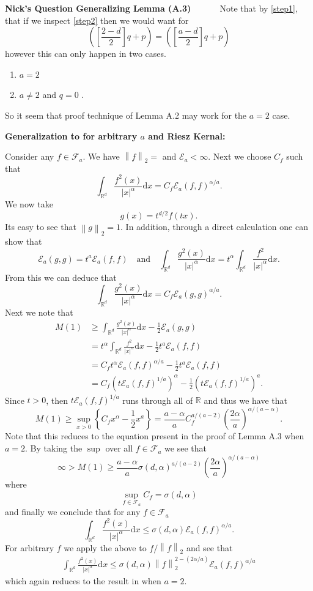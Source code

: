 \documentclass[a4paper,11pt]{article}
\numberwithin{equation}{section}
\theoremstyle{plain}
\theoremstyle{definition}
\newcommand{\ud}{\ensuremath{\mathrm{d} }}
\newcommand{\Norm}[1]{\left\|  #1   \right\|}
\newcommand{\R}{\mathbb{R}}
\newcounter{NQ}
\newenvironment{NickQuestion}[1][] %
{\refstepcounter{NQ}
	\begin{mdframed}[backgroundcolor=lightgray]\textbf{Nick's Question \theNQ \: #1~~}~~~\noindent}%
	{\end{mdframed}}
\numberwithin{NQ}{section}
\numberwithin{LQ}{section}
\numberwithin{ZQ}{section}
\begin{document}
\begin{NickQuestion}[Generalizing Lemma (A.3) \cite{ChenAOP12}]
Note that by \eqref{step1}, that if we inspect \eqref{step2} then we would want for
	\[
		\left(\left[\frac{2-d}{2}\right]q + p\right) = \left( \left[ \frac{a-d}{2}\right]q + p \right)
	\]
however this can only happen in two cases.
	\begin{enumerate}
		\item $a=2$
		\item $a\not= 2$ and $q=0$ .
	\end{enumerate}
So it seem that proof technique of Lemma A.2 \cite{15AIHP} may work for the $a=2$ case.
\vspace{.1in}

\noindent\textbf{Generalization to for arbitrary $a$ and Riesz Kernal:}

Consider any $f \in \mathcal{F}_a$. We have $\Norm{f}_2 = $ and $\mathcal{E}_a < \infty$. Next we choose $C_f$ such that
	\[
		\int_{\R^d} \frac{f^2(x)}{|x|^\alpha} \ud x = C_f  \mathcal{E}_a(f,f)^{\alpha / a}.
	\]
We now take
	\[
		g(x) = t^{d/2} f(tx).
	\]
Its easy to see that $\Norm{g}_2 = 1$. In addition, through a direct calculation one can show that
	\[
		\mathcal{E}_a(g,g) = t^a\mathcal{E}_a(f,f) \quad \text{and} \quad \int_{\R^d} \frac{g^2(x)}{|x|^\alpha} \ud x = t^\alpha \int_{\R^d} \frac{f^2}{|x|^\alpha} \ud x.
	\]
From this we can deduce that
	\[
		\int_{\R^d} \frac{g^2(x)}{|x|^\alpha} \ud x = C_f \mathcal{E}_a(g,g)^{\alpha/a}.
	\]
Next we note that
	\begin{align*}
		M(1) &\ge \int_{\R^d} \frac{g^2(x)}{|x|^\alpha} \ud x - \frac{1}{2}\mathcal{E}_a(g,g)
		\\& = t^\alpha \int_{\R^d} \frac{f^2}{|x|^\alpha} \ud x - \frac{1}{2}t^a \mathcal{E}_a(f,f)
		\\& = C_f t^{\alpha} \mathcal{E}_a(f,f)^{\alpha/a} - \frac{1}{2}t^a \mathcal{E}_a(f,f)
		\\&= C_f \left(t\mathcal{E}_a(f,f)^{1/a}\right)^\alpha - \frac{1}{2} \left( t \mathcal{E}_a(f,f)^{1/a}\right)^a.
	\end{align*}
Since $t>0$, then $ t\mathcal{E}_a(f,f)^{1/a}$ runs through all of $\R$ and thus we have that
	\[
		M(1) \ge \sup_{x>0} \left\{ C_fx^\alpha - \frac{1}{2}x^a \right\} = \frac{a-\alpha}{a}C_f^{a/(a-2)}\left(\frac{2\alpha}{a}\right)^{\alpha/(a-\alpha)}.
	\]
Note that this reduces to the equation present in the proof of Lemma A.3 \cite{ChenAOP12} when $a=2$. By taking the $\sup$ over all $f\in \mathcal{F}_a$ we see that
	\[
		\infty > M(1) \ge \frac{a-\alpha}{a}\sigma(d,\alpha)^{a/(a-2)}\left(\frac{2\alpha}{a}\right)^{\alpha/(a-\alpha)}
	\]
where
	\[
		\sup_{f\in \mathcal{F}_a} C_f = \sigma(d,\alpha)
	\]
and finally we conclude that for any $f\in \mathcal{F}_a$
	\[
		\int_{\R^d} \frac{f^2(x)}{|x|^\alpha} \ud x \le \sigma(d,\alpha) \mathcal{E}_a(f,f)^{\alpha/a}.
	\]
For arbitrary $f$ we apply the above to $f/\Norm{f}_2$ and see that
	\begin{align*}
		\int_{\R^d} \frac{f^2(x)}{|x|^\alpha} \ud x \le \sigma(d,\alpha) \Norm{f}_2^{2-(2\alpha/a)} \mathcal{E}_a(f,f)^{\alpha/a}
	\end{align*}
which again reduces to the result in \cite{ChenAOP12} when $a=2$.
\vspace{.1in}


\end{NickQuestion}
\end{document}
